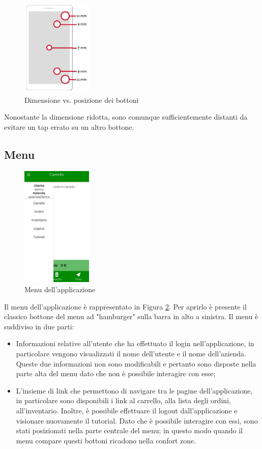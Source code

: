 \documentclass[12pt, a4paper, titlepage]{report}
\begin{document}
	\begin{figure}[H] 
		\centering
		\includegraphics[width=0.3\textwidth]{img/dimvspos}
		\caption{Dimensione vs. posizione dei bottoni}
		\label{fig:dimvspos}
	\end{figure}
	\noindent Nonostante la dimensione ridotta, sono comunque sufficientemente distanti da evitare un tap errato su un altro bottone.
	
	\subsection{Menu}
	\begin{figure}[H] 
		\centering
		\includegraphics[width=0.3\textwidth]{img/menu}
		\caption{Menu dell'applicazione}
		\label{fig:menu}
	\end{figure}
	Il menu dell'applicazione è rappresentato in Figura \ref{fig:menu}. Per aprirlo è presente il classico bottone del menu ad "hamburger" sulla barra in alto a sinistra. Il menu è suddiviso in due parti: 
	\begin{itemize}
		\item Informazioni relative all'utente che ha effettuato il login nell'applicazione, in particolare vengono visualizzati il nome dell'utente e il nome dell'azienda. Queste due informazioni non sono modificabili e pertanto sono disposte nella parte alta del menu dato che non è possibile interagire con esse;
		\item L'insieme di link che permettono di navigare tra le pagine dell'applicazione, in particolare sono disponibili i link al carrello, alla lista degli ordini, all'inventario. Inoltre, è possibile effettuare il logout dall'applicazione e visionare nuovamente il tutorial. Dato che è possibile interagire con essi, sono stati posizionati nella parte centrale del menu; in questo modo quando il menu compare questi bottoni ricadono nella confort zone.
	\end{itemize}
\end{document}
